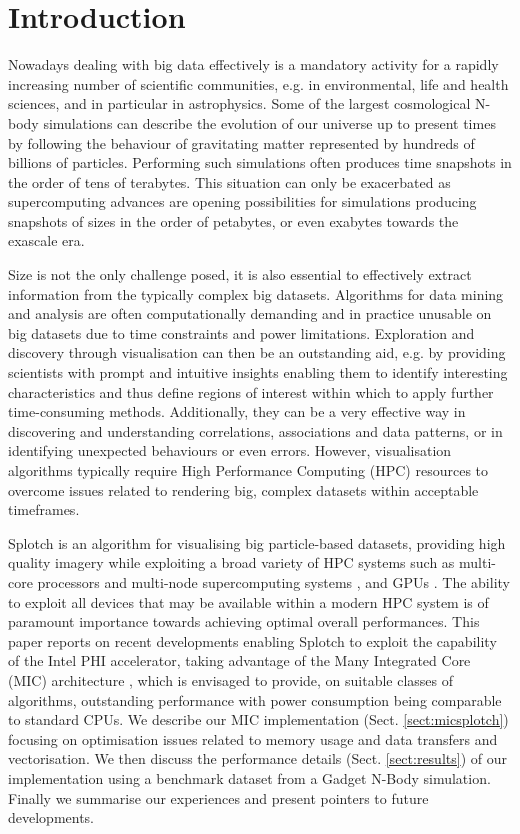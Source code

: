 \documentclass[runningheads,a4paper]{llncs}
\begin{document}
\section{Introduction}
\label{sect:introduction}

Nowadays dealing with big data effectively is a mandatory activity for a rapidly increasing number of scientific communities, 
e.g. in environmental, life and health sciences, and in particular in astrophysics. Some of the largest cosmological N-body 
simulations can describe the evolution of our universe up to present times by following the behaviour of gravitating matter 
represented by hundreds of billions of particles. Performing such simulations often produces time snapshots in the order of tens
of terabytes. This situation can only be exacerbated as supercomputing advances are opening possibilities for simulations 
producing snapshots of sizes in the order of petabytes, or even exabytes towards the exascale era.

Size is not the only challenge posed, it is also essential to effectively extract information from the typically complex big 
datasets. Algorithms for data mining and analysis are often computationally demanding and in practice unusable on big datasets 
due to time constraints and power limitations. Exploration and discovery through visualisation can then be an outstanding aid, 
e.g. by providing scientists with prompt and intuitive insights enabling them to identify interesting characteristics and thus 
define regions of interest within which to apply further time-consuming methods. Additionally, they can be a very effective 
way in discovering and understanding correlations, associations and data patterns, or in identifying unexpected behaviours or 
even errors. However, visualisation algorithms typically require High Performance Computing (HPC) resources to overcome issues 
related to rendering big, complex datasets within acceptable timeframes.

Splotch \cite{splotch} is an algorithm for visualising big particle-based datasets, providing high quality imagery while exploiting 
a broad variety of HPC systems such as multi-core processors and multi-node supercomputing systems \cite{splotchmulti}, and 
GPUs \cite{splotchgpu}. The ability to exploit all devices that may be available within a modern HPC system is of paramount 
importance towards achieving optimal overall performances. This paper reports on recent developments enabling Splotch to 
exploit the capability of the Intel PHI \cite{xeonphi} accelerator, taking advantage of the Many Integrated Core (MIC) 
architecture \cite{mic}, which is envisaged to provide, on suitable classes of algorithms, outstanding performance with power 
consumption being comparable to standard CPUs. We describe our MIC implementation (Sect. \ref{sect:micsplotch}) focusing on 
optimisation issues related to memory usage and data transfers and vectorisation. We then discuss the performance details 
(Sect. \ref{sect:results}) of our implementation using a benchmark dataset from a Gadget \cite{gadget} N-Body simulation. Finally we 
summarise our experiences and present pointers to future developments.
\end{document}
